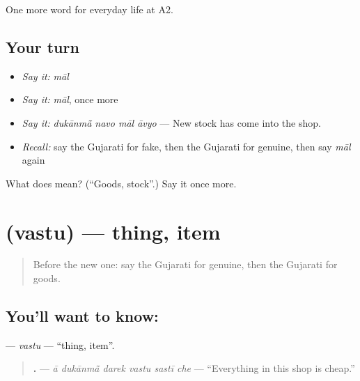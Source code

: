 \begin{grammarlens}[title={What you've built}]
One more word for everyday life at A2.
\end{grammarlens}

\subsection*{Your turn}
\begin{itemize}
\raggedright
  \item \emph{Say it:} \emph{māl}
  \item \emph{Say it:} \emph{māl}, once more
  \item \emph{Say it:} \emph{dukānmā̃ navo māl āvyo} — New stock has come into the shop.
  \item \emph{Recall:} say the Gujarati for fake, then the Gujarati for genuine, then say \emph{māl} again
\end{itemize}

\begin{tcolorbox}[breakable,colback=teal!4,colframe=teal!35!black,title={Before you move on}]
What does  mean? (\textquotedblleft{}Goods, stock\textquotedblright{}.) Say it once more.
\end{tcolorbox}
\section[\texorpdfstring{\gu{વસ્તુ} (vastu)}{વસ્તુ (vastu)}]{ (vastu) — thing, item}

\label{lesson:GU-C188-vastu}



\begin{quote}
Before the new one: say the Gujarati for genuine, then the Gujarati for goods.
\end{quote}

\subsection*{You'll want to know: }
\textbf{} — \emph{vastu} — \textquotedblleft{}thing, item\textquotedblright{}.

\begin{quote}
\textbf{     .} — \emph{ā dukānmā̃ darek vastu sastī che} — \textquotedblleft{}Everything in this shop is cheap.\textquotedblright{}
\end{quote}

